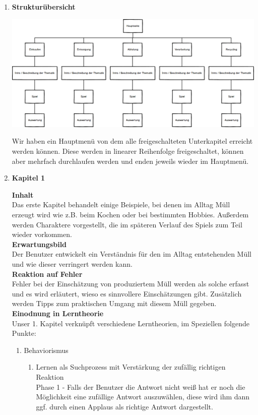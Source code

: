 \documentclass[a4paper]{article}
\newcommand{\TOP}[1]{\item \textbf{#1}\par}
\begin{document}
\begin{enumerate}


\TOP{Strukturübersicht}

\includegraphics[width=\linewidth]{struktur.png}

Wir haben ein Hauptmenü von dem alle freigeschalteten Unterkapitel erreicht werden können. Diese werden in linearer Reihenfolge freigeschaltet, können aber mehrfach durchlaufen werden und enden jeweils wieder im Hauptmenü.

\TOP{Kapitel 1}
\textbf{Inhalt}\\
Das erste Kapitel behandelt einige Beispiele, bei denen im Alltag Müll erzeugt wird wie z.B. beim Kochen oder bei bestimmten Hobbies. Außerdem werden Charaktere vorgestellt, die im späteren Verlauf des Spiels zum Teil wieder vorkommen.\\
\textbf{Erwartungsbild}\\
Der Benutzer entwickelt ein Verständnis für den im Alltag entstehenden Müll und wie dieser verringert werden kann.\\
\textbf{Reaktion auf Fehler}\\
Fehler bei der Einschätzung von produziertem Müll werden als solche erfasst und es wird erläutert, wieso es sinnvollere Einschätzungen gibt. Zusätzlich werden Tipps zum praktischen Umgang mit diesem Müll gegeben.\\
\textbf{Einodnung in Lerntheorie}\\
Unser 1. Kapitel verknüpft verschiedene Lerntheorien, im Speziellen folgende Punkte:\\
\begin{enumerate}

\item Behaviorismus
  \begin{enumerate}
    \item Lernen als Suchprozess mit Verstärkung der zufällig richtigen Reaktion\\
    Phase 1 - Falls der Benutzer die Antwort nicht weiß hat er noch die Möglichkeit eine zufällige Antwort auszuwählen, diese wird ihm dann ggf. durch einen Applaus als richtige Antwort dargestellt.
  \end{enumerate}
  

\end{enumerate}
\end{enumerate}
\end{document}
